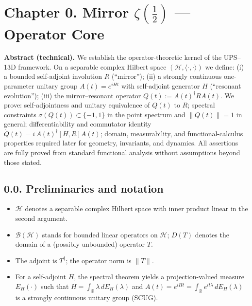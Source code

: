 
\section*{Chapter 0. Mirror $\zeta(\tfrac12)$ — Operator Core}

\noindent\textbf{Abstract (technical).}
We establish the operator-theoretic kernel of the UPS--13D framework.
On a separable complex Hilbert space $(\mathcal{H},\langle\cdot,\cdot\rangle)$ we define:
(i) a bounded self-adjoint involution $R$ (``mirror''); 
(ii) a strongly continuous one-parameter unitary group $A(t)=e^{iHt}$ with self-adjoint generator $H$ (``resonant evolution'');
(iii) the mirror–resonant operator $Q(t):=A(t)^\dagger R A(t)$.
We prove: self-adjointness and unitary equivalence of $Q(t)$ to $R$; spectral constraints $\sigma(Q(t))\subset\{-1,1\}$ in the point spectrum and $\|Q(t)\|=1$ in general; differentiability and commutator identity $\dot Q(t)=i\,A(t)^\dagger [H,R] A(t)$; domain, measurability, and functional-calculus properties required later for geometry, invariants, and dynamics.
All assertions are fully proved from standard functional analysis without assumptions beyond those stated.


\subsection*{0.0. Preliminaries and notation}

\begin{itemize}
  \item $\mathcal{H}$ denotes a separable complex Hilbert space with inner product linear in the second argument.
  \item $\mathcal{B}(\mathcal{H})$ stands for bounded linear operators on $\mathcal{H}$; $D(T)$ denotes the domain of a (possibly unbounded) operator $T$.
  \item The adjoint is $T^\dagger$; the operator norm is $\|T\|$.
  \item For a self-adjoint $H$, the spectral theorem yields a projection-valued measure $E_H(\cdot)$ such that $H=\int_{\mathbb{R}}\lambda\,dE_H(\lambda)$ and $A(t)=e^{iHt}=\int_{\mathbb{R}}e^{it\lambda}\,dE_H(\lambda)$ is a strongly continuous unitary group (SCUG).
\end{itemize}

